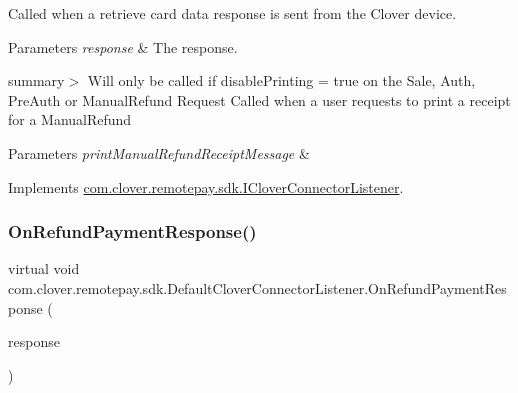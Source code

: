 Called when a retrieve card data response is sent from the Clover device. 


\begin{DoxyParams}{Parameters}
{\em response} & The response.\\
\hline
\end{DoxyParams}
summary$>$ Will only be called if disable\+Printing = true on the Sale, Auth, Pre\+Auth or Manual\+Refund Request Called when a user requests to print a receipt for a Manual\+Refund 


\begin{DoxyParams}{Parameters}
{\em print\+Manual\+Refund\+Receipt\+Message} & \\
\hline
\end{DoxyParams}


Implements \hyperlink{interfacecom_1_1clover_1_1remotepay_1_1sdk_1_1_i_clover_connector_listener_af4bbb0ceeab318ef482f0e90506d36b0}{com.\+clover.\+remotepay.\+sdk.\+I\+Clover\+Connector\+Listener}.

\mbox{\label{classcom_1_1clover_1_1remotepay_1_1sdk_1_1_default_clover_connector_listener_a9129ed4160946b687461c962c7af8e93}} 
\subsubsection{\texorpdfstring{On\+Refund\+Payment\+Response()}{OnRefundPaymentResponse()}}
{\footnotesize\ttfamily virtual void com.\+clover.\+remotepay.\+sdk.\+Default\+Clover\+Connector\+Listener.\+On\+Refund\+Payment\+Response (\begin{DoxyParamCaption}\item[{\hyperlink{classcom_1_1clover_1_1remotepay_1_1sdk_1_1_refund_payment_response}{Refund\+Payment\+Response}}]{response }\end{DoxyParamCaption})\hspace{0.3cm}{\ttfamily [virtual]}}



